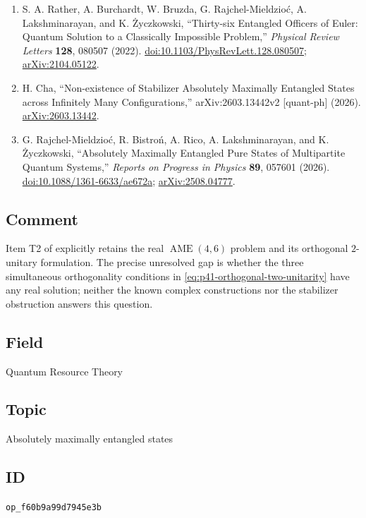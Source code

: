 \begin{enumerate}[label={},leftmargin=4.8em,labelsep=0.5em]
  \footnotesize
  \item[\textup{[RBB+22]}]\label{ref:p41-rather}
  S. A. Rather, A. Burchardt, W. Bruzda, G. Rajchel-Mieldzio\'c,
  A. Lakshminarayan, and K. \.{Z}yczkowski,
  ``Thirty-six Entangled Officers of Euler: Quantum Solution to a
  Classically Impossible Problem,'' \emph{Physical Review Letters}
  \textbf{128}, 080507 (2022).
  \href{https://doi.org/10.1103/PhysRevLett.128.080507}{doi:10.1103/PhysRevLett.128.080507};
  \href{https://arxiv.org/abs/2104.05122}{arXiv:2104.05122}.

  \item[\textup{[Cha26]}]\label{ref:p41-cha}
  H. Cha, ``Non-existence of Stabilizer Absolutely Maximally Entangled
  States across Infinitely Many Configurations,''\newline
  arXiv:2603.13442v2
  [quant-ph] (2026).
  \href{https://arxiv.org/abs/2603.13442}{arXiv:2603.13442}.

  \item[\textup{[RBR+26]}]\label{ref:p41-review}
  G. Rajchel-Mieldzio\'c, R. Bistro\'n, A. Rico, A. Lakshminarayan, and
  K. \.{Z}yczkowski,
  ``Absolutely Maximally Entangled Pure States of Multipartite Quantum
  Systems,'' \emph{Reports on Progress in Physics} \textbf{89}, 057601
  (2026).
  \href{https://doi.org/10.1088/1361-6633/ae672a}{doi:10.1088/1361-6633/ae672a};
  \href{https://arxiv.org/abs/2508.04777}{arXiv:2508.04777}.
\end{enumerate}

\subsection*{Comment}

Item T2 of  explicitly retains the real
$\operatorname{AME}(4,6)$ problem and its orthogonal $2$-unitary formulation.
The precise unresolved gap is whether the three simultaneous orthogonality
conditions in \eqref{eq:p41-orthogonal-two-unitarity} have any real solution;
neither the known complex constructions nor the stabilizer obstruction
answers this question.

\subsection*{Field}

Quantum Resource Theory

\subsection*{Topic}

Absolutely maximally entangled states

\subsection*{ID}

\texttt{op\_f60b9a99d7945e3b}
